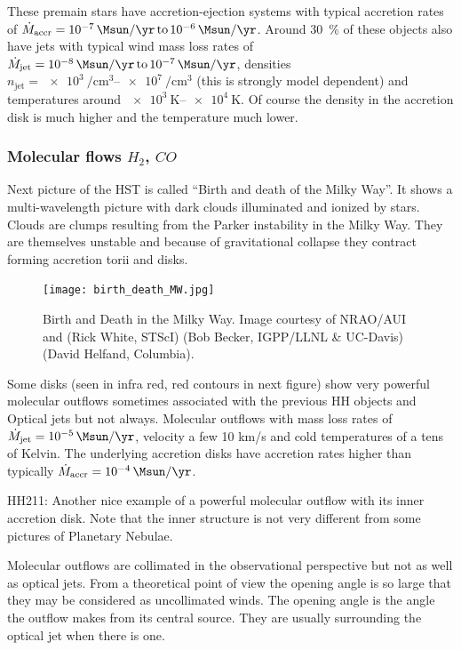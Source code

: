 \documentclass[10pt,a4paper,english]{article}
\newcommand\SIrangeto[2]{\SIrange[range-phrase=\,\text{to}\,]{#1}{#2}}
\begin{document}
These premain stars have accretion-ejection systems with typical accretion
rates of $\dot{M}_\mathrm{accr}=\SIrangeto{e-7}{e-6}{\Msun\per\yr}$. Around
\SI{30}{\percent} of these objects also have jets with typical wind mass loss
rates of $\dot{M}_\mathrm{jet}=\SIrangeto{e-8}{e-7}{\Msun\per\yr}$, densities
$n_\mathrm{jet}=\SIrangeto{e3}{e7}{\per\cubic\cm}$ (this is strongly model
dependent) and temperatures around $\SIrangeto{e3}{e4}{\kelvin}$. Of course the
density in the accretion disk is much higher and the temperature much lower.

\subsubsection{\texorpdfstring{Molecular flows $H_2$, $CO$}{Molecular flows H2, CO}}

Next picture of the HST is called “Birth and death of the Milky Way”. It shows
a multi-wavelength picture with dark clouds illuminated and ionized by stars.
Clouds are clumps resulting from the Parker  instability in the
Milky Way. They are themselves unstable and because of gravitational collapse
they contract forming accretion torii and disks.

\begin{figure}[!ht]
  \centering
  \texttt{[image: birth\_death\_MW.jpg]}
  \caption{Birth and Death in the Milky Way. Image courtesy of NRAO/AUI and (Rick White, STScI) (Bob Becker, IGPP/LLNL \& UC-Davis) (David Helfand, Columbia). }
\end{figure}

Some disks (seen in infra red, red contours in next figure) show very powerful
molecular outflows sometimes associated with the previous HH objects and
Optical jets but not always. Molecular outflows with mass loss rates of
$\dot{M}_\mathrm{jet}=\SI{e-5}{\Msun\per\yr}$, velocity a few 10 km/s and cold
temperatures of a tens of Kelvin. The underlying accretion disks have accretion
rates higher than typically $\dot{M}_\mathrm{accr}=\SI{e-4}{\Msun\per\yr}$.

HH211: Another nice example of a powerful molecular outflow with its inner
accretion disk. Note that the inner structure is not very different from some
pictures of Planetary Nebulae.

Molecular outflows are collimated in the observational perspective but not as
well as optical jets. From a theoretical point of view the opening angle is so
large that they may be considered as uncollimated winds. The opening angle is
the angle the outflow makes from its central source. They are usually
surrounding the optical jet when there is one.
\end{document}
